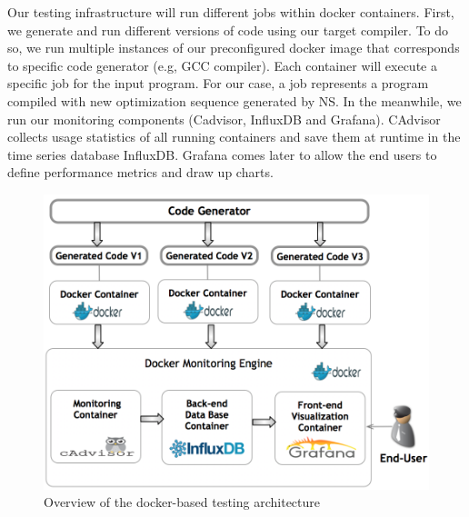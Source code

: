 Our testing infrastructure will run different jobs within docker containers. First, we generate and run different versions of code using our target compiler. To do so, we run multiple instances of our preconfigured docker image that corresponds to specific code generator (e.g, GCC compiler). Each container will execute a specific job for the input program. For our case, a job represents a program compiled with new optimization sequence generated by NS. In the meanwhile, we run our monitoring components (Cadvisor, InfluxDB and Grafana). CAdvisor collects usage statistics of all running containers and save them at runtime in the time series database InfluxDB. Grafana comes later to allow the end users to define performance metrics and draw up charts.
\begin{figure}[h]
	\centering
	\includegraphics[scale=0.50]{Ressources/infra.png}
	\caption{Overview of the docker-based testing architecture}
\end{figure}